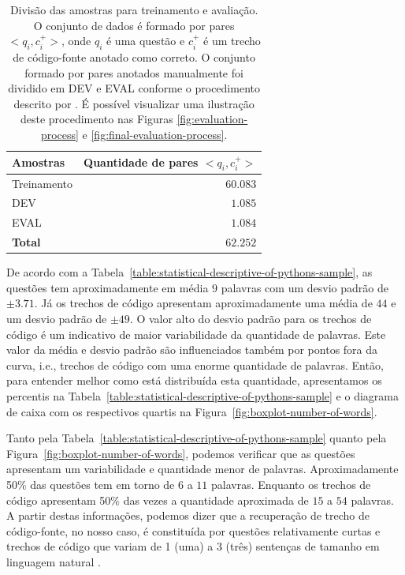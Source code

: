 \begin{table}[h]
\centering
\begin{tabular}{ p{3cm} r  }
 \hline
 \textbf{Amostras} & \textbf{Quantidade de pares $<q_{i}, c_{i}^{+}>$}\\
 \hline
 Treinamento & $60.083$\\
 
 DEV & $1.085$ \\
 
 EVAL & $1.084$\\
 \hline
 \textbf{Total} & $\bm{62.252}$\\
 \hline
\end{tabular}
\caption{Divisão das amostras para treinamento e avaliação. O conjunto de dados é formado por pares $<q_{i}, c_{i}^{+}>$, onde $q_{i}$ é uma questão e $c_{i}^{+}$ é um trecho de código-fonte anotado como correto. O conjunto formado por pares anotados manualmente foi dividido em DEV e EVAL conforme o procedimento descrito por \cite{iyer-etal-2016-summarizing}. É possível visualizar uma ilustração deste procedimento nas Figuras \ref{fig:evaluation-process} e \ref{fig:final-evaluation-process}.}
\label{table:divisao-amostras}
\end{table}

De acordo com a Tabela~\ref{table:statistical-descriptive-of-pythons-sample}, as questões tem aproximadamente em média $9$ palavras com um desvio padrão de $\pm 3.71$. Já os trechos de código apresentam aproximadamente uma média de $44$ e um desvio padrão de $\pm 49$. O valor alto do desvio padrão para os trechos de código é um indicativo de maior variabilidade da quantidade de palavras. Este valor da média e desvio padrão são influenciados também por pontos fora da curva, i.e., trechos de código com uma enorme quantidade de palavras. Então, para entender melhor como está distribuída esta quantidade, apresentamos os percentis na Tabela~\ref{table:statistical-descriptive-of-pythons-sample} e o diagrama de caixa com os respectivos quartis na Figura~\ref{fig:boxplot-number-of-words}.

Tanto pela Tabela~\ref{table:statistical-descriptive-of-pythons-sample} quanto pela Figura~\ref{fig:boxplot-number-of-words}, podemos verificar que as questões apresentam um variabilidade e quantidade menor de palavras. Aproximadamente 50\% das questões tem em torno de $6$ a $11$ palavras. Enquanto os trechos de código apresentam 50\% das vezes a quantidade aproximada de $15$ a $54$ palavras. A partir destas informações, podemos dizer que a recuperação de trecho de código-fonte, no nosso caso, é constituída por questões relativamente curtas e trechos de código que variam de 1 (uma) a 3 (três) sentenças de tamanho em linguagem natural \citep{casi-newell-sentence-length-2018}. 




